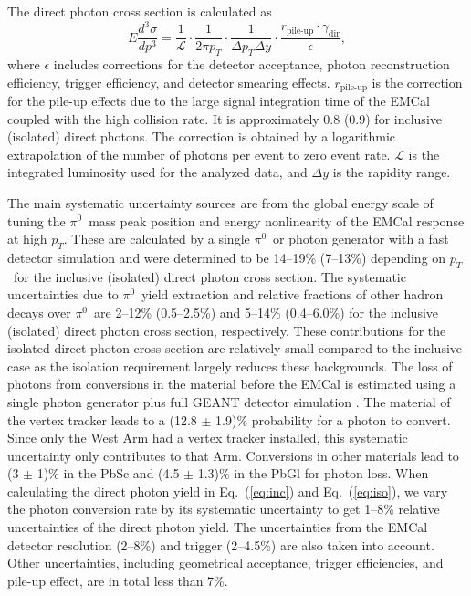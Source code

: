 \documentclass[twocolumn,letterpaper,aps,prl,longbibliography,superscriptaddress,floatfix]{revtex4-2}
\newcommand{\pT}{\ensuremath{p_T}}
\newcommand{\pizero}{\ensuremath{\pi^0}}
\begin{document}
The direct photon cross section is calculated as
\begin{equation} \label{eq:xsecex}
E\frac{d^3\sigma}{dp^3} = \frac{1}{\mathcal{L}} \cdot \frac{1}{2\pi p_T} \cdot \frac{1}{\Delta p_T \Delta y} \cdot \frac{r_{\text{pile-up}} \cdot \gamma_{\text{dir}}}{\epsilon},
\end{equation}
where $\epsilon$ includes corrections for the detector acceptance, photon reconstruction efficiency, trigger efficiency, and detector smearing effects. $r_{\text{pile-up}}$ is the correction for the pile-up effects due to the large signal integration time of the EMCal coupled with the high collision rate. It is approximately 0.8 (0.9) for inclusive (isolated) direct photons. The correction is obtained by a logarithmic extrapolation of the number of photons per event to zero event rate. $\mathcal{L}$ is the integrated luminosity used for the analyzed data, and $\Delta y$ is the rapidity range.

The main systematic uncertainty sources are from the global energy scale of tuning the \pizero\ mass peak position and energy nonlinearity of the EMCal response at high \pT. These are calculated by a single \pizero\ or photon generator with a fast detector simulation and were determined to be 14--19\% (7--13\%) depending on \pT\ for the inclusive (isolated) direct photon cross section. The systematic uncertainties due to \pizero\ yield extraction and relative fractions of other hadron decays over \pizero\ are 2--12\% (0.5--2.5\%) and 5--14\% (0.4--6.0\%) for the inclusive (isolated) direct photon cross section, respectively. These contributions for the isolated direct photon cross section are relatively small compared to the inclusive case as the isolation requirement largely reduces these backgrounds. The loss of photons from conversions in the material before the EMCal is estimated using a single photon generator plus full GEANT detector simulation \cite{Brun:1994aa}. The material of the vertex tracker \cite{SONDHEIM2012993} leads to a (12.8 $\pm$ 1.9)\% probability for a photon to convert. Since only the West Arm had a vertex tracker installed, this systematic uncertainty only contributes to that Arm. Conversions in other materials lead to (3 $\pm$ 1)\% in the PbSc and (4.5 $\pm$ 1.3)\% in the PbGl for photon loss. When calculating the direct photon yield in Eq.~(\ref{eq:inc}) and Eq.~(\ref{eq:iso}), we vary the photon conversion rate by its systematic uncertainty to get 1--8\% relative uncertainties of the direct photon yield. The uncertainties from the EMCal detector resolution (2--8\%) and trigger (2--4.5\%) are also taken into account. Other uncertainties, including geometrical acceptance, trigger efficiencies, and pile-up effect, are in total less than 7\%.
\end{document}
